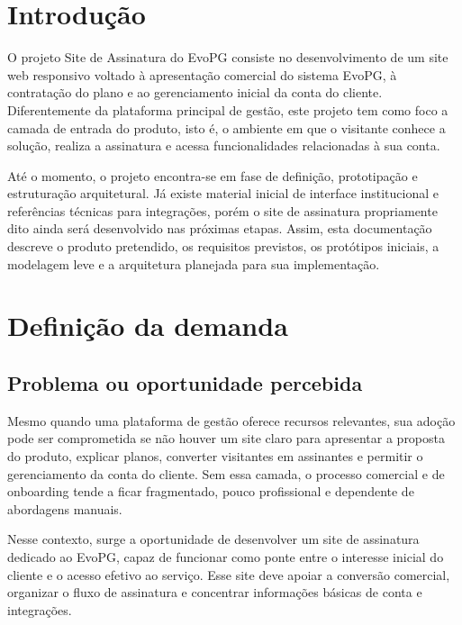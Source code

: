 \documentclass[
  12pt,
  openany,
  oneside,
  a4paper,
  brazil
]{abntex2}
\newcommand{\ProjetoNome}{Site de Assinatura do EvoPG}
\begin{document}
\imprimircapa
\imprimirfolhaderosto*

\tableofcontents
\clearpage

\chapter{Introdu\c{c}\~ao}
O projeto \ProjetoNome{} consiste no desenvolvimento de um site web responsivo voltado \`a apresenta\c{c}\~ao comercial do sistema EvoPG, \`a contrata\c{c}\~ao do plano e ao gerenciamento inicial da conta do cliente. Diferentemente da plataforma principal de gest\~ao, este projeto tem como foco a camada de entrada do produto, isto \'e, o ambiente em que o visitante conhece a solu\c{c}\~ao, realiza a assinatura e acessa funcionalidades relacionadas \`a sua conta.

At\'e o momento, o projeto encontra-se em fase de defini\c{c}\~ao, prototipa\c{c}\~ao e estrutura\c{c}\~ao arquitetural. J\'a existe material inicial de interface institucional e refer\^encias t\'ecnicas para integra\c{c}\~oes, por\'em o site de assinatura propriamente dito ainda ser\'a desenvolvido nas pr\'oximas etapas. Assim, esta documenta\c{c}\~ao descreve o produto pretendido, os requisitos previstos, os prot\'otipos iniciais, a modelagem leve e a arquitetura planejada para sua implementa\c{c}\~ao.

\chapter{Defini\c{c}\~ao da demanda}

\section{Problema ou oportunidade percebida}
Mesmo quando uma plataforma de gest\~ao oferece recursos relevantes, sua ado\c{c}\~ao pode ser comprometida se n\~ao houver um site claro para apresentar a proposta do produto, explicar planos, converter visitantes em assinantes e permitir o gerenciamento da conta do cliente. Sem essa camada, o processo comercial e de onboarding tende a ficar fragmentado, pouco profissional e dependente de abordagens manuais.

Nesse contexto, surge a oportunidade de desenvolver um site de assinatura dedicado ao EvoPG, capaz de funcionar como ponte entre o interesse inicial do cliente e o acesso efetivo ao servi\c{c}o. Esse site deve apoiar a convers\~ao comercial, organizar o fluxo de assinatura e concentrar informa\c{c}\~oes b\'asicas de conta e integra\c{c}\~oes.
\end{document}
